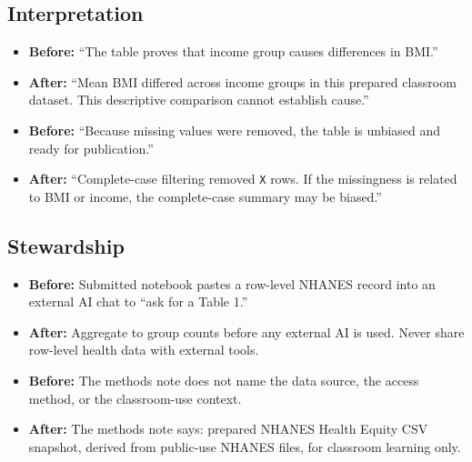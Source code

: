 \documentclass[
  letterpaper,
  DIV=11,
  numbers=noendperiod,
  oneside]{scrreprt}
\begin{document}
\subsection*{Interpretation}\label{interpretation}

\begin{itemize}
\item
  \textbf{Before:} ``The table proves that income group causes
  differences in BMI.''
\item
  \textbf{After:} ``Mean BMI differed across income groups in this
  prepared classroom dataset. This descriptive comparison cannot
  establish cause.''
\item
  \textbf{Before:} ``Because missing values were removed, the table is
  unbiased and ready for publication.''
\item
  \textbf{After:} ``Complete-case filtering removed \texttt{X} rows. If
  the missingness is related to BMI or income, the complete-case summary
  may be biased.''
\end{itemize}

\subsection*{Stewardship}\label{stewardship-1}

\begin{itemize}
\item
  \textbf{Before:} Submitted notebook pastes a row-level NHANES record
  into an external AI chat to ``ask for a Table 1.''
\item
  \textbf{After:} Aggregate to group counts before any external AI is
  used. Never share row-level health data with external tools.
\item
  \textbf{Before:} The methods note does not name the data source, the
  access method, or the classroom-use context.
\item
  \textbf{After:} The methods note says: prepared NHANES Health Equity
  CSV snapshot, derived from public-use NHANES files, for classroom
  learning only.
\end{itemize}
\end{document}
